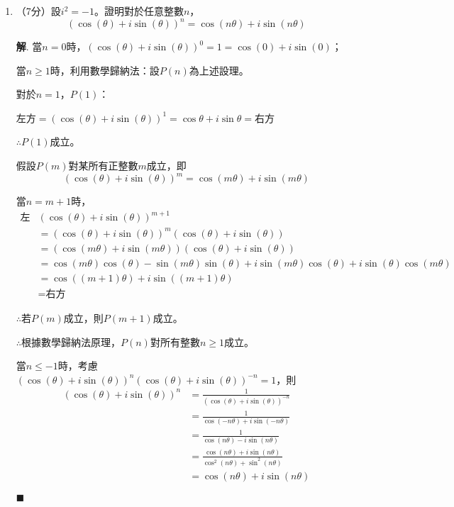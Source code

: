 \documentclass[12pt]{article}
\newenvironment*{sol}{\par \textbf{解}.}{\hfill$\blacksquare$}
\begin{document}
    \begin{enumerate}
        \item （7分）設$i^2=-1$。證明對於任意整數$n$，$$(\cos(\theta)+i\sin(\theta))^n=\cos(n\theta)+i\sin(n\theta)$$\begin{sol}
            當$n=0$時，$(\cos(\theta)+i\sin(\theta))^0=1=\cos(0)+i\sin(0)$；

            當$n\geq 1$時，利用數學歸納法：設$P(n)$為上述設理。

            對於$n=1$，$P(1)$：

            左方$=(\cos(\theta)+i\sin(\theta))^1=\cos{\theta}+i\sin{\theta}=$右方

            $\therefore P(1)$成立。

            假設$P(m)$對某所有正整數$m$成立，即$$(\cos(\theta)+i\sin(\theta))^m=\cos(m\theta)+i\sin(m\theta)$$

            當$n=m+1$時，\begin{align*}
                \textrm{左方}&(\cos(\theta)+i\sin(\theta))^{m+1}\\
                &=(\cos(\theta)+i\sin(\theta))^m(\cos(\theta)+i\sin(\theta))\\
                &=(\cos(m\theta)+i\sin(m\theta))(\cos(\theta)+i\sin(\theta))\\
                &=\cos(m\theta)\cos(\theta)-\sin(m\theta)\sin(\theta)+i\sin(m\theta)\cos(\theta)+i\sin(\theta)\cos(m\theta)\\
                &=\cos((m+1)\theta)+i\sin((m+1)\theta)\\
                &=\textrm{右方}
            \end{align*}

            $\therefore$若$P(m)$成立，則$P(m+1)$成立。

            $\therefore$根據數學歸納法原理，$P(n)$對所有整數$n\geq 1$成立。

            當$n\leq -1$時，考慮$(\cos(\theta)+i\sin(\theta))^n(\cos(\theta)+i\sin(\theta))^{-n}=1$，則\begin{align*}
                (\cos(\theta)+i\sin(\theta))^n&=\frac{1}{(\cos(\theta)+i\sin(\theta))^{-n}}\\
                &=\frac{1}{\cos(-n\theta)+i\sin(-n\theta)}\\
                &=\frac{1}{\cos(n\theta)-i\sin(n\theta)}\\
                &=\frac{\cos(n\theta)+i\sin(n\theta)}{\cos^2(n\theta)+\sin^2(n\theta)}\\
                &=\cos(n\theta)+i\sin(n\theta)
            \end{align*}


\end{sol}
\end{enumerate}
\end{document}
